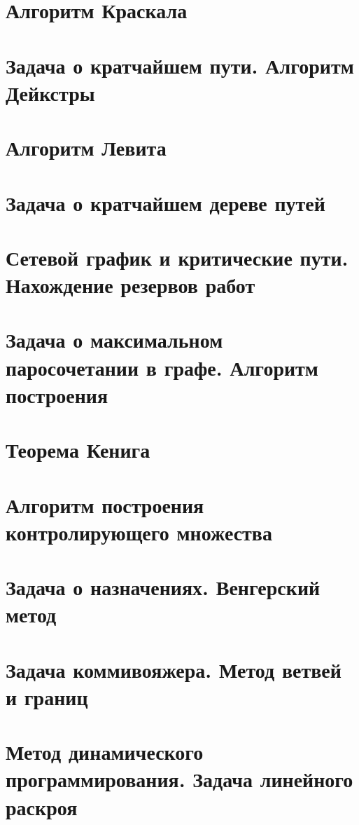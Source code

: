 \documentclass[12pt, fleqn]{article}
\begin{document}
\section{Алгоритм Краскала}


\section{Задача о кратчайшем пути. Алгоритм Дейкстры}


\section{Алгоритм Левита}


\section{Задача о кратчайшем дереве путей}


\section{Сетевой график и критические пути. Нахождение резервов работ}


\section{Задача о максимальном паросочетании в графе. Алгоритм построения}


\section{Теорема Кенига}


\section{Алгоритм построения контролирующего множества}


\section{Задача о назначениях. Венгерский метод}


\section{Задача коммивояжера. Метод ветвей и границ}


\section{Метод динамического программирования. Задача линейного раскроя}
\end{document}
